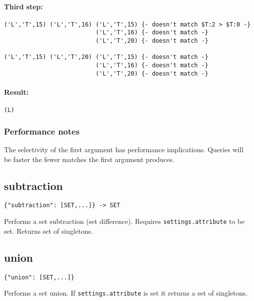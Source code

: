 \documentclass[a4paper]{article}
\begin{document}
\paragraph*{Third step:}

\begin{verbatim}
('L','T',15) ('L','T',16) ('L','T',15) {- doesn't match $T:2 > $T:0 -}
                          ('L','T',16) {- doesn't match -}
                          ('L','T',20) {- doesn't match -}

('L','T',15) ('L','T',20) ('L','T',15) {- doesn't match -}
                          ('L','T',16) {- doesn't match -}
                          ('L','T',20) {- doesn't match -}                      
\end{verbatim}


\paragraph*{Result: }

\begin{verbatim}
(L)
\end{verbatim}

\subsubsection{Performance notes}

The selectivity of the first argument has performance
implications. Queries will be faster the fewer matches the first
argument produces.

\subsection{subtraction}

\begin{verbatim}
{"subtraction": [SET,...]} -> SET
\end{verbatim}

Performs a set subtraction (set difference). Requires
\verb|settings.attribute| to be set. Returns set of singletons.

\subsection{union}

\begin{verbatim}
{"union": [SET,...]}
\end{verbatim}

Performs a set union. If \verb|settings.attribute| is set it returns a
set of singletons.
\end{document}

